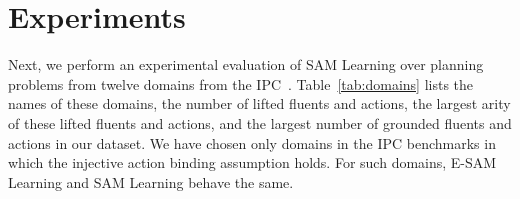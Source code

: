 \documentclass{article}
\begin{document}
\section{Experiments}
Next, we perform an experimental evaluation of SAM Learning over planning problems 
from twelve domains from the IPC~\cite{ipc}. %
Table~\ref{tab:domains} lists the names of these domains, the number of lifted fluents and actions, the largest arity of these lifted fluents and actions, and the largest number of grounded fluents and actions in our dataset. %
We have chosen only domains in the IPC benchmarks in which the injective action binding assumption holds. 
For such domains, E-SAM Learning and SAM Learning behave the same. %
\end{document}
